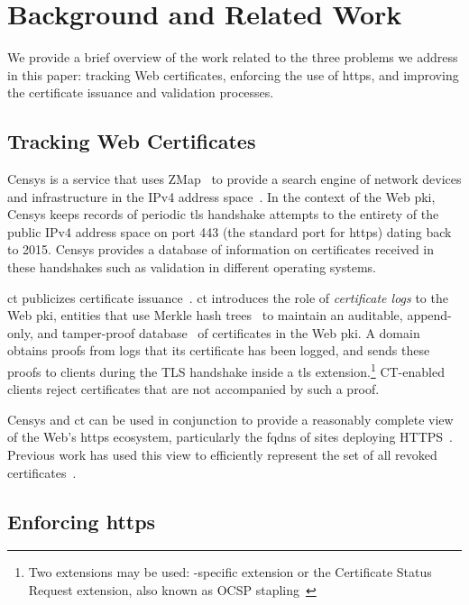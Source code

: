 \section{Background and Related Work}
\label{sec:background}

We provide a brief overview of the work related to the three problems we address
in this paper: tracking Web certificates, enforcing the use of \ac{https}, and
improving the certificate issuance and validation processes.

\subsection{Tracking Web Certificates}\label{sec:tracking}

Censys is a service that uses ZMap~\cite{durumeric2013zmap} to provide a search
engine of network devices and infrastructure in the IPv4 address
space~\cite{durumeric2015search}. In the context of the Web \ac{pki}, Censys
keeps records of periodic \ac{tls} handshake attempts to the entirety of the
public IPv4 address space on port 443 (the standard port for \ac{https}) dating
back to 2015. Censys provides a database of information on certificates received
in these handshakes such as validation in different operating systems.

\acf{ct} publicizes certificate issuance~\cite{rfc6962}. \ac{ct} introduces the
role of \emph{certificate logs} to the Web \ac{pki}, entities that use Merkle
hash trees~\cite{merkle1988digital} to maintain an auditable, append-only, and
tamper-proof database~\cite{crosby2009efficient} of certificates in the Web
\ac{pki}. A domain obtains proofs from logs that its certificate has been
logged, and sends these proofs to clients during the TLS handshake inside a
\ac{tls} extension.\footnote{Two extensions may be used: -specific
extension or the Certificate Status Request extension, also known as OCSP
stapling~\cite{rfc6066}} CT-enabled clients reject certificates that are not
accompanied by such a proof.

Censys and \ac{ct} can be used in conjunction to provide a reasonably complete
view of the Web's \ac{https} ecosystem, particularly the \acp{fqdn} of sites
deploying HTTPS~\cite{vandersloot2016towards}. Previous work has used this view
to efficiently represent the set of all revoked
certificates~\cite{larisch2017crlite}.

\subsection{Enforcing \ac{https}}
\label{sec:background:https}

